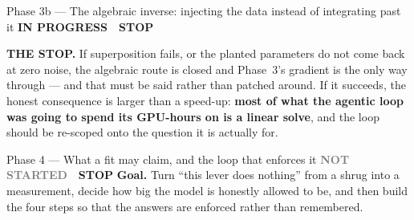 \documentclass[11pt,a4paper]{article}
\newcommand{\prog}{\textcolor{warn}{\textbf{IN PROGRESS}}}
\newcommand{\todo}{\textcolor{grey}{\textbf{NOT STARTED}}}
\newcommand{\stopp}{\textcolor{bad!30!white}{\textbf{STOP}}}
\begin{document}
\begin{phasebox}{Phase 3b --- The algebraic inverse: injecting the data instead of integrating past it \hfill \prog\ \ \stopp}
\begin{stopbox}
\textbf{THE STOP.} If superposition fails, or the planted parameters do not come back at zero noise,
the algebraic route is closed and Phase~3's gradient is the only way through --- and that must be
said rather than patched around. If it succeeds, the honest consequence is larger than a speed-up:
\textbf{most of what the agentic loop was going to spend its GPU-hours on is a linear solve}, and
the loop should be re-scoped onto the question it is actually for.
\end{stopbox}
\end{phasebox}

\begin{phasebox}{Phase 4 --- What a fit may claim, and the loop that enforces it \hfill \todo\ \ \stopp}
\textbf{Goal.} Turn ``this lever does nothing'' from a shrug into a measurement, decide how big the
model is honestly allowed to be, and then build the four steps so that the answers are enforced
rather than remembered.


\end{phasebox}
\end{document}
